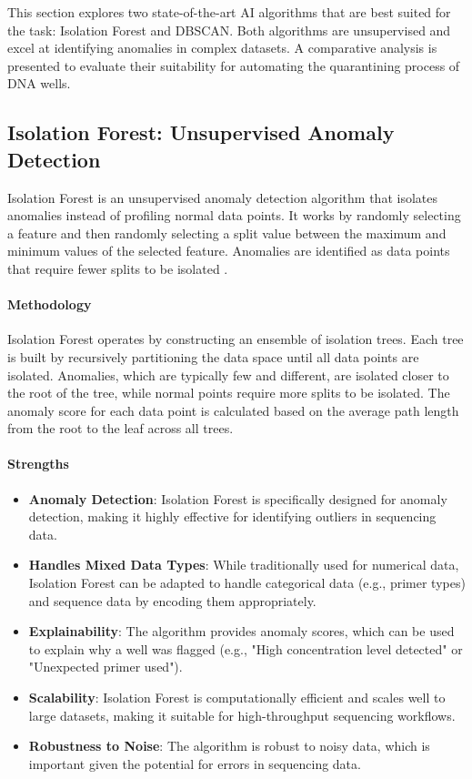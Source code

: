 This section explores two state-of-the-art AI algorithms that are best suited for the task: Isolation Forest and DBSCAN. Both algorithms are unsupervised and excel at identifying anomalies in complex datasets. A comparative analysis is presented to evaluate their suitability for automating the quarantining process of DNA wells.

\subsection{Isolation Forest: Unsupervised Anomaly Detection}
Isolation Forest is an unsupervised anomaly detection algorithm that isolates anomalies instead of profiling normal data points. It works by randomly selecting a feature and then randomly selecting a split value between the maximum and minimum values of the selected feature. Anomalies are identified as data points that require fewer splits to be isolated \cite{liu2008isolation}.

\paragraph{Methodology}
Isolation Forest operates by constructing an ensemble of isolation trees. Each tree is built by recursively partitioning the data space until all data points are isolated. Anomalies, which are typically few and different, are isolated closer to the root of the tree, while normal points require more splits to be isolated. The anomaly score for each data point is calculated based on the average path length from the root to the leaf across all trees.

\paragraph{Strengths}
\begin{itemize}
\item \textbf{Anomaly Detection}: Isolation Forest is specifically designed for anomaly detection, making it highly effective for identifying outliers in sequencing data.
\item \textbf{Handles Mixed Data Types}: While traditionally used for numerical data, Isolation Forest can be adapted to handle categorical data (e.g., primer types) and sequence data by encoding them appropriately.
\item \textbf{Explainability}: The algorithm provides anomaly scores, which can be used to explain why a well was flagged (e.g., "High concentration level detected" or "Unexpected primer used").
\item \textbf{Scalability}: Isolation Forest is computationally efficient and scales well to large datasets, making it suitable for high-throughput sequencing workflows.
\item \textbf{Robustness to Noise}: The algorithm is robust to noisy data, which is important given the potential for errors in sequencing data.
\end{itemize}

